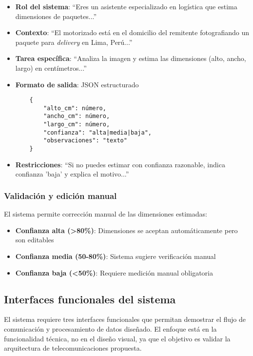 \begin{itemize}
    \item \textbf{Rol del sistema}: ``Eres un asistente especializado en logística que estima dimensiones de paquetes...''
    
    \item \textbf{Contexto}: ``El motorizado está en el domicilio del remitente fotografiando un paquete para \textit{delivery} en Lima, Perú...''
    
    \item \textbf{Tarea específica}: ``Analiza la imagen y estima las dimensiones (alto, ancho, largo) en centímetros...''
    
    \item \textbf{Formato de salida}: JSON estructurado
    \begin{verbatim}
    {
        "alto_cm": número,
        "ancho_cm": número,
        "largo_cm": número,
        "confianza": "alta|media|baja",
        "observaciones": "texto"
    }
    \end{verbatim}
    
    \item \textbf{Restricciones}: ``Si no puedes estimar con confianza razonable, indica confianza 'baja' y explica el motivo...''
\end{itemize}

\subsubsection{Validación y edición manual}

El sistema permite corrección manual de las dimensiones estimadas:

\begin{itemize}
    \item \textbf{Confianza alta (>80\%)}: Dimensiones se aceptan automáticamente pero son editables
    \item \textbf{Confianza media (50-80\%)}: Sistema sugiere verificación manual
    \item \textbf{Confianza baja (<50\%)}: Requiere medición manual obligatoria
\end{itemize}

\subsection{Interfaces funcionales del sistema}

El sistema requiere tres interfaces funcionales que permitan demostrar el flujo de comunicación y procesamiento de datos diseñado. El enfoque está en la funcionalidad técnica, no en el diseño visual, ya que el objetivo es validar la arquitectura de telecomunicaciones propuesta.

